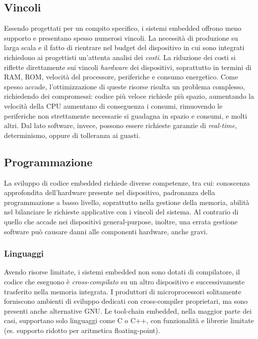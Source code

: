 \documentclass[target=bach,aauheader=,style=]{thud}
\begin{document}
    	\subsection{Vincoli}
    	Essendo progettati per un compito specifico, i sistemi embedded offrono meno supporto e presentano spesso numerosi vincoli. La necessità di produzione su larga scala e il fatto di rientrare nel budget del dispositivo in cui sono integrati richiedono ai progettisti un'attenta analisi dei \textit{costi}. La riduzione dei costi si riflette direttamente sui vincoli \textit{hardware} dei dispositivi, soprattutto in termini di RAM, ROM, velocità del processore, periferiche e consumo energetico. Come spesso accade, l'ottimizzazione di queste risorse risulta un problema complesso, richiedendo dei compromessi: codice più veloce richiede più spazio, aumentando la velocità della CPU aumentano di conseguenza i consumi, rimuovendo le periferiche non strettamente necessarie si guadagna in spazio e consumi, e molti altri.
    	Dal lato software, invece, possono essere richieste garanzie di \textit{real-time}, determinismo, oppure di tolleranza ai guasti.\cite{embeddedsys}
    	\subsection{Programmazione}
    	La sviluppo di codice embedded richiede diverse competenze, tra cui: conoscenza approfondita dell'hardware presente nel dispositivo, padronanza della programmazione a basso livello, soprattutto nella gestione della memoria, abilità nel bilanciare le richieste applicative con i vincoli del sistema.
    	Al contrario di quello che accade nei dispositivi general-purpose, inoltre, una errata gestione software può causare danni alle componenti hardware, anche gravi.
    		\subsubsection{Linguaggi}
    		Avendo risorse limitate, i sistemi embedded non sono dotati di compilatore, il codice che eseguono è \textit{cross-compilato} su un altro dispositivo e successivamente trasferito nella memoria integrata. I produttori di microprocessori solitamente forniscono ambienti di sviluppo dedicati con cross-compiler proprietari, ma sono presenti anche alternative GNU.
    		Le tool-chain embedded, nella maggior parte dei casi, supportano solo linguaggi come C o C++, con funzionalità e librerie limitate (es. supporto ridotto per aritmetica floating-point).
\end{document}

